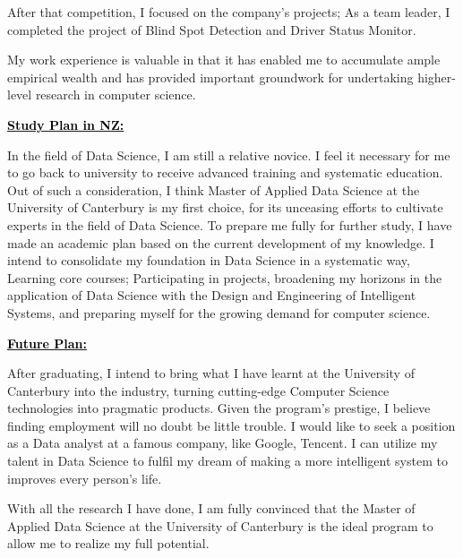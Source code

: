 \documentclass[12pt]{article}
\newcommand{\statement}[1]{\par\medskip
  \underline{\textcolor{black}{\textbf{#1:}}}\space
}
\begin{document}
\bigskip

After that competition, I focused on the company's projects; As a team leader, I completed the project of Blind Spot Detection and Driver Status Monitor.

\bigskip

My work experience is valuable in that it has enabled me to accumulate ample empirical wealth and has provided important groundwork for undertaking higher-level research in computer science.

\bigskip

\statement{Study Plan in NZ}
In the field of Data Science, I am still a relative novice. I feel it necessary for me to go back to university to receive advanced training and systematic education. Out of such a consideration, I think Master of Applied Data Science at the University of Canterbury is my first choice, for its unceasing efforts to cultivate experts in the field of Data Science. To prepare me fully for further study, I have made an academic plan based on the current development of my knowledge. I intend to consolidate my foundation in Data Science in a systematic way, Learning core courses; Participating in projects, broadening my horizons in the application of Data Science with the Design and Engineering of Intelligent Systems, and preparing myself for the growing demand for computer science. 

\bigskip

\statement{Future Plan}
After graduating, I intend to bring what I have learnt at the University of Canterbury into the industry, turning cutting-edge Computer Science technologies into pragmatic products. Given the program's prestige, I believe finding employment will no doubt be little trouble. I would like to seek a position as a Data analyst at a famous company, like Google, Tencent. I can utilize my talent in Data Science to fulfil my dream of making a more intelligent system to improves every person's life.

\bigskip

With all the research I have done, I am fully convinced that the Master of Applied Data Science at the University of Canterbury is the ideal program to allow me to realize my full potential.
\end{document}
